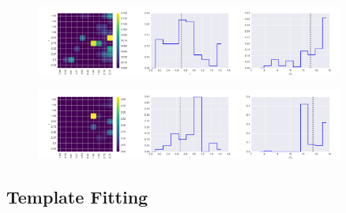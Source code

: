 \documentclass[12pt, preprint]{aastex}
\begin{document}
\begin{figure}
\includegraphics[width=0.3\textwidth]{../fig/rf3.png}\includegraphics[width=0.3\textwidth]{../fig/rf3z.png}\includegraphics[width=0.3\textwidth]{../fig/rf3m.png}
\caption{}
\label{fig:rf-good}
\end{figure}

\begin{figure}
\includegraphics[width=0.3\textwidth]{../fig/rf8.png}\includegraphics[width=0.3\textwidth]{../fig/rf8z.png}\includegraphics[width=0.3\textwidth]{../fig/rf8m.png}
\caption{}
\label{fig:rf-good}
\end{figure}

\subsection{Template Fitting}
\end{document}
